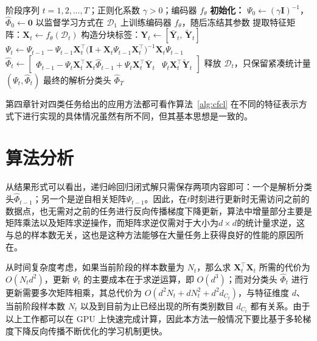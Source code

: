 \begin{algorithm}[t]
\caption{递归岭回归闭式解持续学习（统一算法）}
\label{alg:cfcl}
\begin{algorithmic}[1]
\REQUIRE 阶段序列 $t=1,2,\ldots,T$；正则化系数 $\gamma>0$；编码器 $f_\theta$
\STATE \textbf{初始化：} $\Psi_0\leftarrow(\gamma\mathbf{I})^{-1}$，$\widehat{\Phi}_0\leftarrow\mathbf{0}$
\STATE 以监督学习方式在 $\mathcal{D}_1$ 上训练编码器 $f_\theta$，随后冻结其参数
    \STATE 提取特征矩阵：$\mathbf{X}_t\leftarrow f_\theta(\mathcal{D}_t)$
    \STATE 构造分块标签：$\mathbf{Y}_t\leftarrow[\bar{\mathbf{Y}}_t,\,\tilde{\mathbf{Y}}_t]$
    \STATE {}
    \STATE $\Psi_t\leftarrow\Psi_{t-1}-\Psi_{t-1}\mathbf{X}_t^{\top}\big(\mathbf{I}+\mathbf{X}_t\Psi_{t-1}\mathbf{X}_t^{\top}\big)^{-1}\mathbf{X}_t\Psi_{t-1}$
    \STATE {}
    \STATE $\widehat{\Phi}_t\leftarrow\begin{bmatrix}
    \widehat{\Phi}_{t-1}-\Psi_t\mathbf{X}_t^{\top}\mathbf{X}_t\widehat{\Phi}_{t-1}+\Psi_t\mathbf{X}_t^{\top}\bar{\mathbf{Y}}_t & \Psi_t\mathbf{X}_t^{\top}\tilde{\mathbf{Y}}_t
    \end{bmatrix}$
    \STATE 释放 $\mathcal{D}_t$，只保留紧凑统计量 $(\Psi_t,\widehat{\Phi}_t)$
\ENDFOR
\RETURN 最终的解析分类头 $\widehat{\Phi}_T$
\end{algorithmic}
\end{algorithm}

第四章针对四类任务给出的应用方法都可看作算法~\ref{alg:cfcl} 在不同的特征表示方式下进行实现的具体情况虽然有所不同，但其基本思想是一致的。

\section{算法分析}

从结果形式可以看出，递归岭回归闭式解只需保存两项内容即可：一个是解析分类头$\widehat{\Phi}_{t-1}$；另一个是逆自相关矩阵$\Psi_{t-1}$。因此，在$t$时刻进行更新时无需访问之前的数据点，也无需对之前的任务进行反向传播梯度下降更新，算法中增量部分主要是矩阵乘法以及矩阵求逆操作，而矩阵求逆仅需对于大小为$d\times d$的统计量求逆，这与总的样本数无关，这也是这种方法能够在大量任务上获得良好的性能的原因所在。

从时间复杂度考虑，如果当前阶段的样本数量为 $N_t$，那么求 $\mathbf{X}_t^{\top}\mathbf{X}_t$ 所需的代价为 $O(N_td^2)$，更新 $\Psi_t$ 的主要成本在于求逆运算，即 $O(d^3)$；而对分类头 $\widehat{\Phi}_t$ 进行更新需要多次矩阵相乘，其总代价为 $O(d^2 N_t + d N_t^2 + d^2 d_{C_t})$，与特征维度 $d$、当前阶段样本数 $N_t$ 以及到目前为止已经出现的所有类别数目 $d_{C_t}$ 都有关系。由于以上工作都可以在 GPU 上快速完成计算，因此本方法一般情况下要比基于多轮梯度下降反向传播不断优化的学习机制更快。

